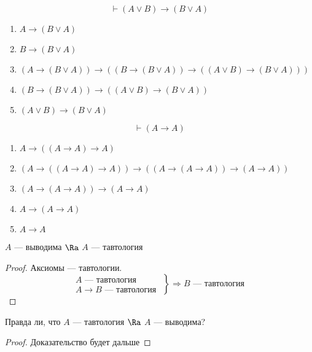 \begin{example}
    $$\vdash (A \vee B) \rightarrow (B\vee A)$$
    \begin{enumerate}
        \item $A \rightarrow (B\vee A)$
        \item $B \rightarrow (B\vee A)$
        \item $(A\rightarrow(B\vee A)) \rightarrow((B \rightarrow (B \vee A))\rightarrow (( A \vee B ) \rightarrow (B \vee A )))$
        \item $(B \rightarrow (B \vee A)) \rightarrow ((A\vee B) \rightarrow (B \vee A))$
        \item $(A\vee B) \rightarrow (B \vee A)$
    \end{enumerate}
\end{example}

\begin{example}
    $$\vdash (A \rightarrow A)$$
    \begin{enumerate}
        \item $A \rightarrow ((A \rightarrow A) \rightarrow A)$
        \item $(A \rightarrow ((A \rightarrow A) \rightarrow A)) \rightarrow ((A \rightarrow (A \rightarrow A)) \rightarrow (A \rightarrow A))$
        \item $(A \rightarrow (A \rightarrow A)) \rightarrow (A \rightarrow A)$
        \item $A \rightarrow (A \rightarrow A)$
        \item $A \rightarrow A$
    \end{enumerate}
\end{example}

\begin{theorem}
    \(A\) --- выводима \(\Ra\) \(A\) --- тавтология
\end{theorem}
\begin{proof}
    Аксиомы --- тавтологии.
    $$\left.\begin{array}{r}
        A\text{ --- тавтология }  \\
        A\rightarrow B \text{ --- тавтология } 
    \end{array}\right\} \Rightarrow B\text{ --- тавтология }$$
\end{proof}

\begin{theorem}[О полноте]
    Правда ли, что \(A\) --- тавтология \(\Ra\) \(A\) --- выводима?
\end{theorem}
\begin{proof}
    Доказательство будет дальше
\end{proof}